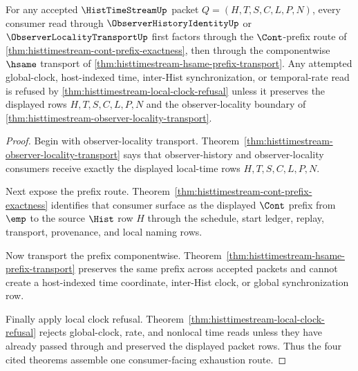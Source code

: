 \begin{theorem}
\label{thm:histtimestream-prefix-transport-exhaustion}
For any accepted $\HistTimeStreamUp$ packet $Q=(H,T,S,C,L,P,N)$, every consumer read through $\ObserverHistoryIdentityUp$ or $\ObserverLocalityTransportUp$ first factors through the $\Cont$-prefix route of \autoref{thm:histtimestream-cont-prefix-exactness}, then through the componentwise $\hsame$ transport of \autoref{thm:histtimestream-hsame-prefix-transport}. Any attempted global-clock, host-indexed time, inter-Hist synchronization, or temporal-rate read is refused by \autoref{thm:histtimestream-local-clock-refusal} unless it preserves the displayed rows $H,T,S,C,L,P,N$ and the observer-locality boundary of \autoref{thm:histtimestream-observer-locality-transport}.
\end{theorem}
\begin{proof}
Begin with observer-locality transport. Theorem~\ref{thm:histtimestream-observer-locality-transport} says that observer-history and observer-locality consumers receive exactly the displayed local-time rows $H,T,S,C,L,P,N$.

Next expose the prefix route. Theorem~\ref{thm:histtimestream-cont-prefix-exactness} identifies that consumer surface as the displayed $\Cont$ prefix from $\emp$ to the source $\Hist$ row $H$ through the schedule, start ledger, replay, transport, provenance, and local naming rows.

Now transport the prefix componentwise. Theorem~\ref{thm:histtimestream-hsame-prefix-transport} preserves the same prefix across accepted packets and cannot create a host-indexed time coordinate, inter-Hist clock, or global synchronization row.

Finally apply local clock refusal. Theorem~\ref{thm:histtimestream-local-clock-refusal} rejects global-clock, rate, and nonlocal time reads unless they have already passed through and preserved the displayed packet rows. Thus the four cited theorems assemble one consumer-facing exhaustion route.
\end{proof}

